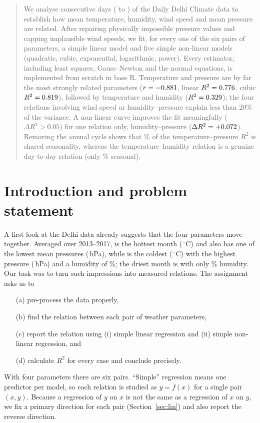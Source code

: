 \documentclass[11pt,a4paper]{article}
\newcommand{\Rsq}{R^2}
\begin{document}
\begin{abstract}
We analyse \nDays{} consecutive days (\dateStart{} to \dateEnd) of the Daily Delhi
Climate data to establish how mean temperature, humidity, wind speed and mean
pressure are related. After repairing \nPressFixed{} physically impossible pressure
values and capping \nWindCapped{} implausible wind speeds, we fit, for every one of
the six pairs of parameters, a simple linear model and five simple non-linear
models (quadratic, cubic, exponential, logarithmic, power). Every estimator,
including least squares, Gauss--Newton and the normal equations, is implemented
from scratch in base R. Temperature and pressure are by far the most strongly
related parameters ($r=\rTP$, linear $\Rsq=\RlinTP$, cubic $\Rsq=\RbestTP$),
followed by temperature and humidity ($\Rsq=\RlinTH$); the four relations
involving wind speed or humidity--pressure explain less than 20\% of the variance.
A non-linear curve improves the fit meaningfully ($\Delta\Rsq>0.05$) for one relation
only, humidity--pressure ($\Delta\Rsq=\gainHP$). Removing the annual cycle shows
that \seasShareTP\% of the temperature--pressure $\Rsq$ is shared seasonality,
whereas the temperature--humidity relation is a genuine day-to-day relation
(only \seasShareTH\% seasonal).
\end{abstract}

\tableofcontents
\clearpage

\section{Introduction and problem statement}

A first look at the Delhi data already suggests that the four parameters move
together. Averaged over 2013--2017, \hotMonth{} is the hottest month
(\hotMonthTemp\,$^\circ$C) and also has one of the lowest mean pressures
(\hotMonthPress\,hPa), while \coldMonth{} is the coldest (\coldMonthTemp\,$^\circ$C) with
the highest pressure (\coldMonthPress\,hPa) and a humidity of \coldMonthHum\%; the driest
month is \dryMonth{} with only \dryMonthHum\% humidity. Our task was to turn such
impressions into measured relations. The assignment asks us to
\begin{enumerate}
  \item[(a)] pre-process the data properly,
  \item[(b)] find the relation between each pair of weather parameters,
  \item[(c)] report the relation using (i) simple linear regression and
             (ii) simple non-linear regression, and
  \item[(d)] calculate $\Rsq$ for every case and conclude precisely.
\end{enumerate}
With four parameters there are six pairs. ``Simple'' regression means one
predictor per model, so each relation is studied as $y=f(x)$ for a single pair
$(x,y)$. Because a regression of $y$ on $x$ is not the same as a regression of
$x$ on $y$, we fix a primary direction for each pair (Section~\ref{sec:lin}) and
also report the reverse direction.
\end{document}

